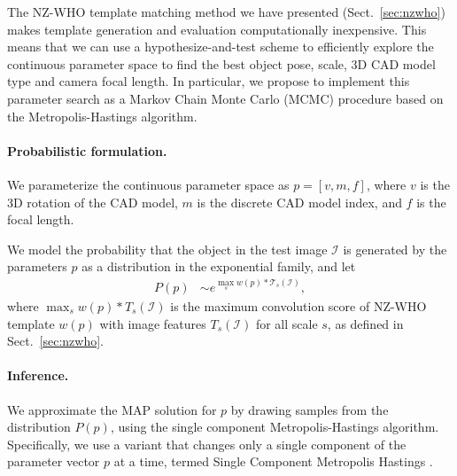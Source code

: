 The NZ-WHO template matching method we have presented
(Sect.~\ref{sec:nzwho}) makes template generation and evaluation
computationally inexpensive. This means that we can use a
hypothesize-and-test scheme to efficiently explore the continuous
parameter space to find the best object pose, scale, 3D CAD model type
and camera focal length.
%
In particular, we propose to implement this parameter search as a
Markov Chain Monte Carlo (MCMC) procedure based on the
Metropolis-Hastings algorithm.

\paragraph{Probabilistic formulation.}
We parameterize the continuous parameter space as  $p = [v, m, f]$,
where $v$ is the 3D rotation of the CAD model, $m$ is the discrete CAD
model index, and $f$ is the focal length.

We model the probability that the object in the test image
$\mathcal{I}$ is generated by the parameters $p$ as a distribution in
the exponential family, and let
\begin{align}
    P(p) & \sim e^{ \max_{s} w(p) \ast \mathcal{T}_s(\mathcal{I})},
\end{align}
where $\max_{s} w(p) \ast T_s(\mathcal{I})$ is the maximum convolution score of
NZ-WHO template $w(p)$ with image features $T_s(\mathcal{I})$ for all scale $s$, as defined
in Sect.~\ref{sec:nzwho}. 

\paragraph{Inference.}
We approximate the MAP solution for $p$ by drawing samples from the
distribution $P(p)$, using the single component Metropolis-Hastings
algorithm. Specifically, we use a variant that changes only a single
component of the parameter vector $p$ at a time, termed Single
Component Metropolis Hastings \cite{mcmc}.

